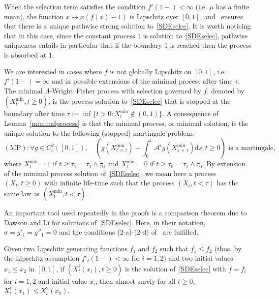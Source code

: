 \documentclass[AHL,Unicode,longabstracts,published]{cedram}
\newcommand{\ddr}{\mathrm{d}}
\newcommand{\rms}{\mathrm{s}}
\newcommand{\MP}{\mathrm{MP}}
\newcommand{\clA}{\mathcal{A}}
\let\oldforall\forall
\renewcommand*{\forall}{\mathrel{\oldforall}}
\begin{document}
\begin{rema}\label{Lipschitzrem}
When the selection term satisfies the condition $f'(1-)<\infty$ (i.e. $\mu$ has a finite mean), the function $x\mapsto x(f(x)-1)$ is Lipschitz over $[0,1]$, and~\cite[Theorem~2.1]{DawsonLi} ensures that there is a unique pathwise strong solution to~\eqref{SDEselec}. It is worth noticing that in this case, since the constant process $1$ is solution to~\eqref{SDEselec}, pathwise uniqueness entails in particular that if the boundary $1$ is reached then the process is absorbed at $1$.
\end{rema}

We are interested in cases where $f$ is not globally Lipschitz on $[0,1]$, i.e. $f'(1-)=\infty$ and in possible extensions of the minimal process after time $\tau$. The minimal $\Lambda$-Wright--Fisher process with selection governed by $f$, denoted by $(X_t^{\min},t\geq 0)$, is the process solution to~\eqref{SDEselec} that is stopped at the boundary after time $\tau:=\inf\{t>0: X^{\min}_t \notin (0,1)\}$. A consequence of Lemma~\ref{minimalprocess} is that the minimal process, or minimal solution, is the unique solution to the following (stopped) martingale problem:
\[
(\MP): \forall g\in C^2_c([0,1]), \quad \left(g\left(X^{\min}_{t\,\wedge\,\tau}\right)-\int_{0}^{t}\clA^{\rms}g\left(X^{\min}_{s\,\wedge\,\tau}\right)\ddr s, t\geq 0\right) \text{ is a martingale,}
\]
where $X^{\min}_{t}=1$ if $t\geq \tau_1=\tau_1\wedge \tau_0$ and $X^{\min}_{t}=0$ if $t\geq \tau_0=\tau_1\wedge \tau_0$. By extension of the minimal process solution of~\eqref{SDEselec}, we mean here a process $(X_t,t\geq 0)$ with infinite life-time such that the process $(X_{t},t<\tau)$ has the same law as $(X^{\min}_{t},t<\tau)$.

An important tool used repeatedly in the proofs is a comparison theorem due to Dawson and Li for solutions of~\eqref{SDEselec}. Here, in their notation, $\sigma=g'_1=g''_1=0$ and the conditions (2-a)-(2-d) of~\cite[Theorem~2.2]{DawsonLi} are fulfilled.

\begin{theo}\label{comparisontheorem}
Given two Lipschitz generating functions $f_1$ and $f_2$ such that $f_1\leq f_2$ (thus, by the Lipschitz assumption $f'_i(1-)<\infty$ for $i=1,2$) and two initial values $x_1\leq x_2$ in $[0,1]$, if $(X^i_t(x_i),t\geq 0)$ is the solution of~\eqref{SDEselec} with $f=f_i$ for $i=1,2$ and initial value $x_i$, then almost surely for all $t\geq 0$, $X^{1}_t(x_1)\leq X^{2}_t(x_2)$.
\end{theo}
\end{document}
